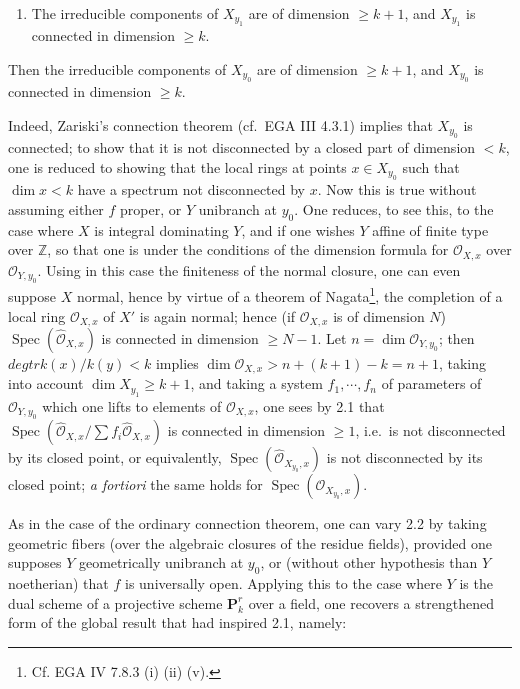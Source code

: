 \documentclass[
]{article}
\providecommand{\tightlist}{%
  \setlength{\itemsep}{0pt}\setlength{\parskip}{0pt}}
\begin{document}
\begin{enumerate}
\def\labelenumi{\alph{enumi})}
\setcounter{enumi}{1}
\tightlist
\item
  The irreducible components of \(X_{y_{1}}\) are of dimension
  \(\geqslant k + 1\), and \(X_{y_{1}}\) is connected in dimension
  \(\geqslant k\).
\end{enumerate}

Then the irreducible components of \(X_{y_{0}}\) are of dimension
\(\geqslant k + 1\), and \(X_{y_{0}}\) is connected in dimension
\(\geqslant k\).

Indeed, Zariski's connection theorem (cf.~EGA III 4.3.1) implies that
\(X_{y_{0}}\) is connected; to show that it is not disconnected by a
closed part of dimension \(< k\), one is reduced to showing that the
local rings at points \(x \in X_{y_{0}}\) such that \(\dim x < k\) have
a spectrum not disconnected by \(x\). Now this is true without assuming
either \(f\) proper, or \(Y\) unibranch at \(y_{0}\). One reduces, to
see this, to the case where \(X\) is integral dominating \(Y\), and if
one wishes \(Y\) affine of finite type over \(\mathbb{Z}\), so that one
is under the conditions of the dimension formula for
\(\mathcal{O}_{X,x}\) over \(\mathcal{O}_{Y,y_{0}}\). Using in this case
the finiteness of the normal closure, one can even suppose \(X\) normal,
hence by virtue of a theorem of Nagata\footnote{Cf. EGA IV 7.8.3 (i)
  (ii) (v).}, the completion of a local ring \(\mathcal{O}_{X,x}\) of
\(X'\) is again normal; hence (if \(\mathcal{O}_{X,x}\) is of dimension
\(N\)) \(\operatorname{Spec}(\hat{\mathcal{O}}_{X,x})\) is connected in
dimension \(\geqslant N - 1\). Let \(n = \dim \mathcal{O}_{Y,y_{0}}\);
then \(deg tr k(x)/k(y) < k\) implies
\(\dim \mathcal{O}_{X,x} > n + (k + 1) - k = n + 1\), taking into
account \(\dim X_{y_{1}} \geqslant k + 1\), and taking a system
\(f_{1}, \cdots, f_{n}\) of parameters of \(\mathcal{O}_{Y,y_{0}}\)
which one lifts to elements of \(\mathcal{O}_{X,x}\), one sees by 2.1
that
\(\operatorname{Spec}(\hat{\mathcal{O}}_{X,x} / \sum f_{i} \hat{\mathcal{O}}_{X,x})\)
is connected in dimension \(\geqslant 1\), i.e.~is not disconnected by
its closed point, or equivalently,
\(\operatorname{Spec}(\hat{\mathcal{O}}_{X_{y_{0}},x})\) is not
disconnected by its closed point; \emph{a fortiori} the same holds for
\(\operatorname{Spec}(\mathcal{O}_{X_{y_{0}},x})\).

As in the case of the ordinary connection theorem, one can vary 2.2 by
taking geometric fibers (over the algebraic closures of the residue
fields), provided one supposes \(Y\) geometrically unibranch at
\(y_{0}\), or (without other hypothesis than \(Y\) noetherian) that
\(f\) is universally open. Applying this to the case where \(Y\) is the
dual scheme of a projective scheme \(\mathbf{P}^{r}_{k}\) over a field,
one recovers a strengthened form of the global result that had inspired
2.1, namely:
\end{document}

